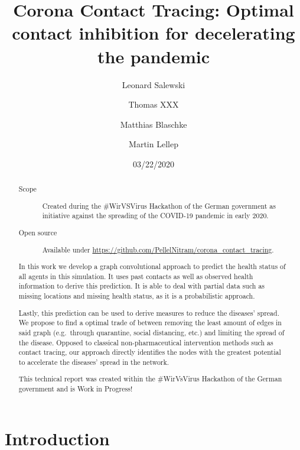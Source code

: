 \documentclass[%
 reprint,
 amsmath,amssymb,showkeys,
 aps,
]{revtex4-1}
\begin{document}
\title{Corona Contact Tracing: Optimal contact inhibition for decelerating the pandemic}

\author{Leonard Salewski}
\author{Thomas XXX}
\author{Matthias Blaschke}
\author{Martin Lellep}

\date{03/22/2020}

\begin{abstract}
	
	\begin{description}
		\item[Scope] Created during the \#WirVSVirus Hackathon of the German government as initiative against the spreading of the COVID-19 pandemic in early 2020.
		\item[Open source] Available under \url{https://github.com/PellelNitram/corona_contact_tracing}.
	\end{description}

	
	In this work we develop a graph convolutional approach to predict the health status of all agents in this simulation.	It uses past contacts as well as observed health information to derive this prediction.
	It is able to deal with partial data such as missing locations and missing health status, as it is a probabilistic approach.
	
	Lastly, this prediction can be used to derive measures to reduce the diseases' spread.
	We propose to find a optimal trade of between removing the least amount of edges in said graph (e.g.\ through quarantine, social distancing, etc.) and limiting the spread of the disease.
	Opposed to classical non-pharmaceutical intervention methods such as contact tracing, our approach directly identifies the nodes with the greatest potential to accelerate the diseases' spread in the network.
	
	This technical report was created within the \#WirVsVirus Hackathon of the German government and is Work in Progress!

\end{abstract}

\maketitle

\section{\label{sec:introcution}Introduction}
\end{document}
